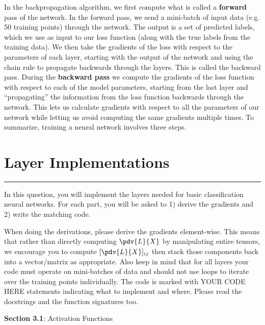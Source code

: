\documentclass{article}
\begin{document}
In the backpropagation algorithm, we first compute what is called a \textbf{forward} pass of the network. In the forward pass, we send a mini-batch of input data (e.g. 50 training points) through the network. The output is a set of predicted labels, which we use as input to our loss function (along with the true labels from the training data). We then take the gradients of the loss with respect to the parameters of each layer, starting with the output of the network and using the chain rule to propagate backwards through the layers. This is called the backward pass. During the \textbf{backward pass} we compute the gradients of the loss function with respect to each of the model parameters, starting from the last layer and ``propagating'' the information from the loss function backwards through the network. This lets us calculate gradients with respect to all the parameters of our network while letting us avoid computing the same gradients multiple times.
To summarize, training a neural network involves three steps.

\newpage
\section*{Layer Implementations}
\hrule

In this question, you will implement the layers needed for basic classification neural networks. For each part, you will be asked to 1) derive the gradients and 2) write the matching code.

When doing the derivations, please derive the gradients element-wise. This means that rather than directly computing $\pdv{L}{X}$ by manipulating entire tensors, we encourage you to compute $[\pdv{L}{X}]_{ij}$ then stack those components back into a vector/matrix as appropriate. Also keep in mind that for all layers your code must operate on mini-batches of data and should not use loops to iterate over the training points individually. The code is marked with YOUR CODE HERE statements indicating what to implement and where. Please read the docstrings and the function signatures too.

\textbf{Section 3.1}: Activation Functions
\end{document}
